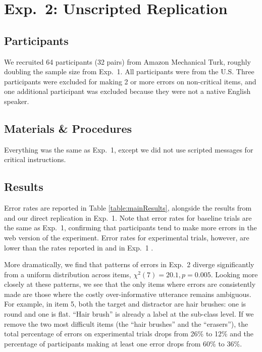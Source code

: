 \documentclass[10pt,letterpaper]{article}
\begin{document}
\section{Exp.~2: Unscripted Replication}
\label{sec:Exp2}

\subsection{Participants}

We recruited 64 participants (32 pairs) from Amazon Mechanical Turk, roughly doubling the sample size from Exp.~1. All participants were from the U.S. Three participants were excluded for making 2 or more errors on non-critical items, and one additional participant was excluded because they were not a native English speaker.

\subsection{Materials \& Procedures}

Everything was the same as Exp.~1, except we did not use scripted messages for critical instructions. 
 
\subsection{Results}

Error rates are reported in Table \ref{table:mainResults}, alongside the results from  and our direct replication in Exp.~1. Note that error rates for baseline trials are the same as Exp.~1, confirming that participants tend to make more errors in the web version of the experiment. Error rates for experimental trials, however, are lower than the rates reported in  and in Exp.~1 . 

More dramatically, we find that patterns of errors in Exp.~2 diverge significantly from a uniform distribution across items, $\chi^2(7) = 20.1, p = 0.005$. Looking more closely at these patterns, we see that the only items where errors are consistently made are those where the costly over-informative utterance remains ambiguous. For example, in item 5, both the target and distractor are hair brushes: one is round and one is flat. ``Hair brush'' is already a label at the sub-class level. If we remove the two most difficult items (the ``hair brushes'' and the ``erasers''), the total percentage of errors on experimental trials drops from 26\% to 12\% and the percentage of participants making at least one error drops from 60\% to 36\%.
\end{document}
